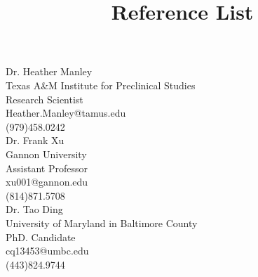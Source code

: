 \documentclass[12pt]{article}
\title{Reference List}
\begin{document}
Dr. Heather Manley\\ 
\indent Texas A\&M Institute for Preclinical Studies\\
\indent Research Scientist\\
\indent Heather.Manley@tamus.edu\\
\indent (979)458.0242\\

Dr. Frank Xu\\
\indent Gannon University\\
\indent Assistant Professor\\
\indent xu001@gannon.edu\\
\indent (814)871.5708\\

Dr. Tao Ding\\
\indent University of Maryland in Baltimore County\\
\indent PhD. Candidate\\
\indent cq13453@umbc.edu\\
\indent (443)824.9744
\end{document}
